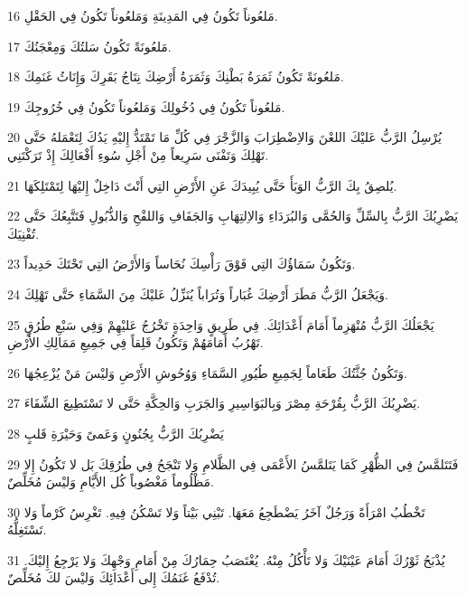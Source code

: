 \par 16 مَلعُوناً تَكُونُ فِي المَدِينَةِ وَمَلعُوناً تَكُونُ فِي الحَقْلِ.
\par 17 مَلعُونَةً تَكُونُ سَلتُكَ وَمِعْجَنُكَ.
\par 18 مَلعُونَةً تَكُونُ ثَمَرَةُ بَطْنِكَ وَثَمَرَةُ أَرْضِكَ نِتَاجُ بَقَرِكَ وَإِنَاثُ غَنَمِكَ.
\par 19 مَلعُوناً تَكُونُ فِي دُخُولِكَ وَمَلعُوناً تَكُونُ فِي خُرُوجِكَ.
\par 20 يُرْسِلُ الرَّبُّ عَليْكَ اللعْنَ وَالاِضْطِرَابَ وَالزَّجْرَ فِي كُلِّ مَا تَمْتَدُّ إِليْهِ يَدُكَ لِتَعْمَلهُ حَتَّى تَهْلِكَ وَتَفْنَى سَرِيعاً مِنْ أَجْلِ سُوءِ أَفْعَالِكَ إِذْ تَرَكْتَنِي.
\par 21 يُلصِقُ بِكَ الرَّبُّ الوَبَأَ حَتَّى يُبِيدَكَ عَنِ الأَرْضِ التِي أَنْتَ دَاخِلٌ إِليْهَا لِتَمْتَلِكَهَا.
\par 22 يَضْرِبُكَ الرَّبُّ بِالسِّلِّ وَالحُمَّى وَالبُرَدَاءِ وَالاِلتِهَابِ وَالجَفَافِ وَاللفْحِ وَالذُّبُولِ فَتَتَّبِعُكَ حَتَّى تُفْنِيَكَ.
\par 23 وَتَكُونُ سَمَاؤُكَ التِي فَوْقَ رَأْسِكَ نُحَاساً وَالأَرْضُ التِي تَحْتَكَ حَدِيداً.
\par 24 وَيَجْعَلُ الرَّبُّ مَطَرَ أَرْضِكَ غُبَاراً وَتُرَاباً يُنَزِّلُ عَليْكَ مِنَ السَّمَاءِ حَتَّى تَهْلِكَ.
\par 25 يَجْعَلُكَ الرَّبُّ مُنْهَزِماً أَمَامَ أَعْدَائِكَ. فِي طَرِيقٍ وَاحِدَةٍ تَخْرُجُ عَليْهِمْ وَفِي سَبْعِ طُرُقٍ تَهْرُبُ أَمَامَهُمْ وَتَكُونُ قَلِقاً فِي جَمِيعِ مَمَالِكِ الأَرْضِ.
\par 26 وَتَكُونُ جُثَّتُكَ طَعَاماً لِجَمِيعِ طُيُورِ السَّمَاءِ وَوُحُوشِ الأَرْضِ وَليْسَ مَنْ يُزْعِجُهَا.
\par 27 يَضْرِبُكَ الرَّبُّ بِقُرْحَةِ مِصْرَ وَبِالبَوَاسِيرِ وَالجَرَبِ وَالحِكَّةِ حَتَّى لا تَسْتَطِيعَ الشِّفَاءَ.
\par 28 يَضْرِبُكَ الرَّبُّ بِجُنُونٍ وَعَمىً وَحَيْرَةِ قَلبٍ
\par 29 فَتَتَلمَّسُ فِي الظُّهْرِ كَمَا يَتَلمَّسُ الأَعْمَى فِي الظَّلامِ وَلا تَنْجَحُ فِي طُرُقِكَ بَل لا تَكُونُ إِلا مَظْلُوماً مَغْصُوباً كُل الأَيَّامِ وَليْسَ مُخَلِّصٌ.
\par 30 تَخْطُبُ امْرَأَةً وَرَجُلٌ آخَرُ يَضْطَجِعُ مَعَهَا. تَبْنِي بَيْتاً وَلا تَسْكُنُ فِيهِ. تَغْرِسُ كَرْماً وَلا تَسْتَغِلُّهُ.
\par 31 يُذْبَحُ ثَوْرُكَ أَمَامَ عَيْنَيْكَ وَلا تَأْكُلُ مِنْهُ. يُغْتَصَبُ حِمَارُكَ مِنْ أَمَامِ وَجْهِكَ وَلا يَرْجِعُ إِليْكَ. تُدْفَعُ غَنَمُكَ إِلى أَعْدَائِكَ وَليْسَ لكَ مُخَلِّصٌ.
